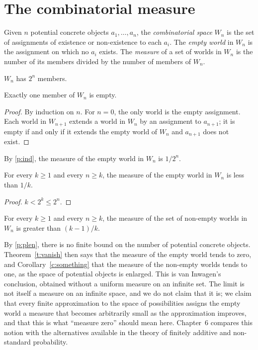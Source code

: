 \documentclass{situationist-preprint}
\begin{document}
\section{The combinatorial measure}

\begin{definition}\label{d:space}
Given $n$ potential concrete objects $a_1, \ldots, a_n$, the \emph{combinatorial space} $W_n$ is the set of assignments of existence or non-existence to each $a_i$. The \emph{empty world} in $W_n$ is the assignment on which no $a_i$ exists. The \emph{measure} of a set of worlds in $W_n$ is the number of its members divided by the number of members of $W_n$.
\end{definition}

\begin{proposition}\label{p:card}
$W_n$ has $2^n$ members.
\end{proposition}

\begin{proposition}\label{p:unique}
Exactly one member of $W_n$ is empty.
\end{proposition}

\begin{proof}
By induction on $n$. For $n = 0$, the only world is the empty assignment. Each world in $W_{n+1}$ extends a world in $W_n$ by an assignment to $a_{n+1}$; it is empty if and only if it extends the empty world of $W_n$ and $a_{n+1}$ does not exist.
\end{proof}

By \ref{p:ind}, the measure of the empty world in $W_n$ is $1/2^n$.

\begin{theorem}\label{t:vanish}
For every $k \geq 1$ and every $n \geq k$, the measure of the empty world in $W_n$ is less than $1/k$.
\end{theorem}

\begin{proof}
$k < 2^k \leq 2^n$.
\end{proof}

\begin{corollary}\label{c:something}
For every $k \geq 1$ and every $n \geq k$, the measure of the set of non-empty worlds in $W_n$ is greater than $(k - 1)/k$.
\end{corollary}

By \ref{p:plen}, there is no finite bound on the number of potential concrete objects. Theorem~\ref{t:vanish} then says that the measure of the empty world tends to zero, and Corollary~\ref{c:something} that the measure of the non-empty worlds tends to one, as the space of potential objects is enlarged. This is van Inwagen's conclusion, obtained without a uniform measure on an infinite set. The limit is not itself a measure on an infinite space, and we do not claim that it is; we claim that every finite approximation to the space of possibilities assigns the empty world a measure that becomes arbitrarily small as the approximation improves, and that this is what \enquote{measure zero} should mean here. Chapter~6 compares this notion with the alternatives available in the theory of finitely additive and non-standard probability.
\end{document}
